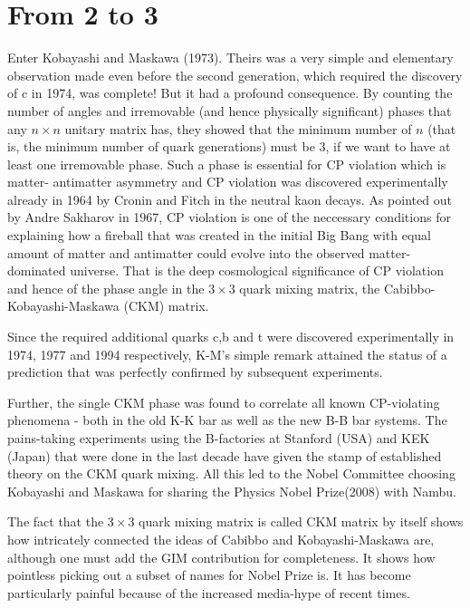 \section*{From 2 to 3}

Enter Kobayashi and Maskawa (1973). Theirs was a very simple and
elementary observation made even before the second generation,
which required the discovery of c in 1974, was complete! But
it had a profound consequence. By counting the number of
angles and irremovable (and hence physically significant) phases
that any $n \times n$ unitary matrix has, they showed that the minimum 
number of $n$ (that is, the minimum number of quark generations)
must be 3, if we want to have at least one irremovable phase.
Such a phase is essential for CP violation which is matter-
antimatter asymmetry and CP violation was discovered experimentally
already in 1964 by Cronin and Fitch in the neutral kaon decays.
As pointed out by Andre Sakharov in 1967, CP violation is one of
the neccessary conditions for explaining how a fireball that was 
created in the initial Big Bang with equal amount of matter and 
antimatter could evolve into the observed matter-dominated 
universe. That is the deep cosmological significance of CP
violation and hence of the phase angle in the $3 \times 3$ quark mixing
matrix, the Cabibbo-Kobayashi-Maskawa (CKM) matrix.
 
Since the required additional quarks c,b and t were discovered
experimentally in 1974, 1977 and 1994 respectively, K-M's simple
remark attained the status of a prediction that was perfectly
confirmed by subsequent experiments.

Further, the single CKM phase was found to correlate all known
CP-violating phenomena - both in the old K-K bar as well as 
the new B-B bar systems. The pains-taking experiments using the
B-factories at Stanford (USA) and KEK (Japan) that were done in 
the last decade have given the stamp of established theory on the
CKM quark mixing. All this led to the Nobel Committee choosing
Kobayashi and Maskawa for sharing the Physics Nobel Prize(2008)   
with Nambu.
  
The fact that the $3\times3$ quark mixing matrix is called CKM matrix
by itself shows how intricately connected the ideas of Cabibbo
and Kobayashi-Maskawa are, although one must add the GIM
contribution for completeness. It shows how pointless picking
out a subset of names for Nobel Prize is. It has become
particularly painful because of the increased media-hype of
recent times.

